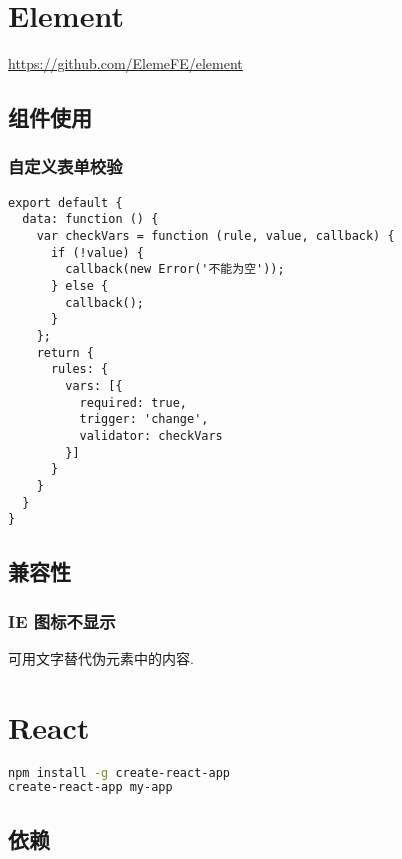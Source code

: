\section{Element}\label{element}

\url{https://github.com/ElemeFE/element}

\subsection{组件使用}\label{ux7ec4ux4ef6ux4f7fux7528}

\subsubsection{自定义表单校验}\label{ux81eaux5b9aux4e49ux8868ux5355ux6821ux9a8c}

\begin{lstlisting}
export default {
  data: function () {
    var checkVars = function (rule, value, callback) {
      if (!value) {
        callback(new Error('不能为空'));
      } else {
        callback();
      }
    };
    return {
      rules: {
        vars: [{
          required: true,
          trigger: 'change',
          validator: checkVars
        }]
      }
    }
  }
}
\end{lstlisting}

\subsection{兼容性}\label{ux517cux5bb9ux6027}

\subsubsection{IE 图标不显示}\label{ie-ux56feux6807ux4e0dux663eux793a}

可用文字替代伪元素中的内容.

\section{React}\label{react}

\begin{lstlisting}[language=bash]
npm install -g create-react-app
create-react-app my-app
\end{lstlisting}

\subsection{依赖}\label{ux4f9dux8d56}

